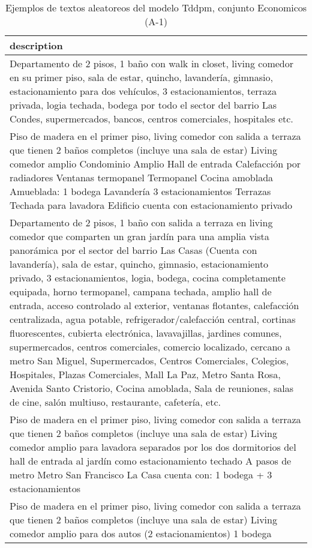 \begin{table}[H]
\centering
\fontsize{8}{14}\selectfont
\caption{Ejemplos de textos aleatoreos del modelo Tddpm, conjunto Economicos (A-1)}
\label{table-sample10-economicos-a-1-tddpm_mlp-text}
\begin{tabular}{|m{50em}|}
\hline
\rowcolor[gray]{0.8}
description \\
\hline Departamento de 2 pisos, 1 baño con walk in closet, living comedor en su primer piso, sala de estar, quincho, lavandería, gimnasio, estacionamiento para dos vehículos, 3 estacionamientos, terraza privada, logia techada, bodega por todo el sector del barrio Las Condes, supermercados, bancos, centros comerciales, hospitales etc. \\
\hline Piso de madera en el primer piso, living comedor con salida a terraza que tienen 2 baños completos (incluye una sala de estar) Living comedor amplio Condominio Amplio Hall de entrada Calefacción por radiadores Ventanas termopanel Termopanel Cocina amoblada Amueblada: 1 bodega Lavandería 3 estacionamientos Terrazas Techada para lavadora Edificio cuenta con estacionamiento privado \\
\hline Departamento de 2 pisos, 1 baño con salida a terraza en living comedor que comparten un gran jardín para una amplia vista panorámica por el sector del barrio Las Casas (Cuenta con lavandería), sala de estar, quincho, gimnasio, estacionamiento privado, 3 estacionamientos, logia, bodega, cocina completamente equipada, horno termopanel, campana techada, amplio hall de entrada, acceso controlado al exterior, ventanas flotantes, calefacción centralizada, agua potable, refrigerador/calefacción central, cortinas fluorescentes, cubierta electrónica, lavavajillas, jardines comunes, supermercados, centros comerciales, comercio localizado, cercano a metro San Miguel, Supermercados, Centros Comerciales, Colegios, Hospitales, Plazas Comerciales, Mall La Paz, Metro Santa Rosa, Avenida Santo Cristorio, Cocina amoblada, Sala de reuniones, salas de cine, salón multiuso, restaurante, cafetería, etc. \\
\hline Piso de madera en el primer piso, living comedor con salida a terraza que tienen 2 baños completos (incluye una sala de estar) Living comedor amplio para lavadora separados por los dos dormitorios del hall de entrada al jardín como estacionamiento techado A pasos de metro Metro San Francisco La Casa cuenta con: 1 bodega + 3 estacionamientos \\
\hline Piso de madera en el primer piso, living comedor con salida a terraza que tienen 2 baños completos (incluye una sala de estar) Living comedor amplio para dos autos (2 estacionamientos) 1 bodega \\

\end{tabular}
\end{table}
